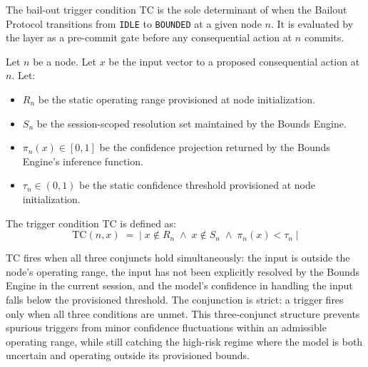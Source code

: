 The bail-out trigger condition TC is the sole determinant of when the Bailout Protocol transitions from \texttt{IDLE} to \texttt{BOUNDED} at a given node $n$. It is evaluated by the \fact{} layer as a pre-commit gate before any consequential action at $n$ commits.

\begin{definition}
\label{def:trigger-condition}
Let $n$ be a \bxthree{} node. Let $x$ be the input vector to a proposed consequential action at $n$. Let:
\begin{itemize}\itemsep=0pt
\item $R_n$ be the static operating range provisioned at node initialization.
\item $S_n$ be the session-scoped resolution set maintained by the Bounds Engine.
\item $\pi_n(x) \in [0,1]$ be the confidence projection returned by the Bounds Engine's inference function.
\item $\tau_n \in (0,1)$ be the static confidence threshold provisioned at node initialization.
\end{itemize}
The trigger condition TC is defined as:
\begin{equation}
\label{eq:tc}
\text{TC}(n, x) \;=\; \big|\; x \notin R_n \;\land\; x \notin S_n \;\land\; \pi_n(x) < \tau_n \;\big|
\end{equation}
\end{definition}

TC fires when all three conjuncts hold simultaneously: the input is outside the node's operating range, the input has not been explicitly resolved by the Bounds Engine in the current session, and the model's confidence in handling the input falls below the provisioned threshold. The conjunction is strict: a trigger fires only when all three conditions are unmet. This three-conjunct structure prevents spurious triggers from minor confidence fluctuations within an admissible operating range, while still catching the high-risk regime where the model is both uncertain and operating outside its provisioned bounds.

